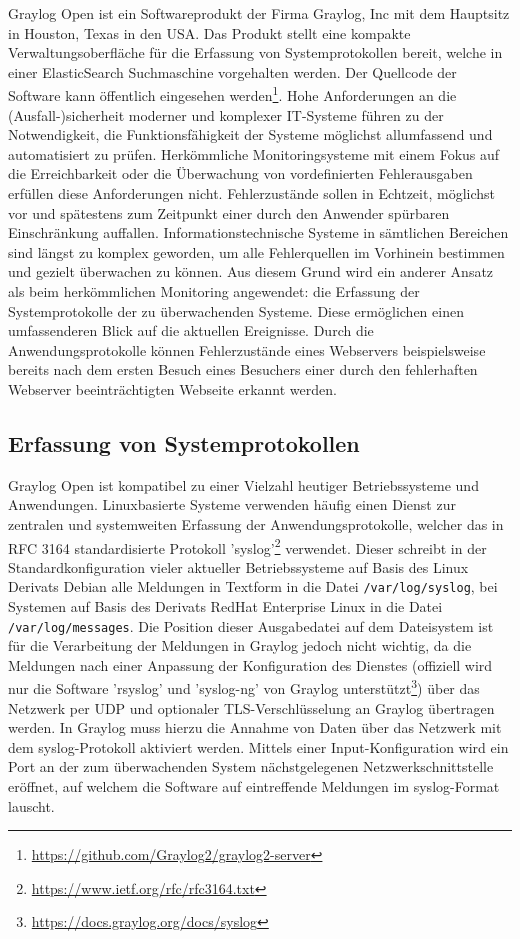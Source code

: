 Graylog Open ist ein Softwareprodukt der Firma Graylog, Inc mit dem Hauptsitz in Houston, Texas in den USA. Das Produkt stellt eine kompakte Verwaltungsoberfläche für die Erfassung von Systemprotokollen bereit, welche in einer ElasticSearch Suchmaschine vorgehalten werden. Der Quellcode der Software kann öffentlich eingesehen werden\footnote{\url{https://github.com/Graylog2/graylog2-server}}. Hohe Anforderungen an die (Ausfall-)sicherheit moderner und komplexer IT-Systeme führen zu der Notwendigkeit, die Funktionsfähigkeit der Systeme möglichst allumfassend und automatisiert zu prüfen. Herkömmliche Monitoringsysteme mit einem Fokus auf die Erreichbarkeit oder die Überwachung von vordefinierten Fehlerausgaben erfüllen diese Anforderungen nicht. Fehlerzustände sollen in Echtzeit, möglichst vor und spätestens zum Zeitpunkt einer durch den Anwender spürbaren Einschränkung auffallen. Informationstechnische Systeme in sämtlichen Bereichen sind längst zu komplex geworden, um alle Fehlerquellen im Vorhinein bestimmen und gezielt überwachen zu können. Aus diesem Grund wird ein anderer Ansatz als beim herkömmlichen Monitoring angewendet: die Erfassung der Systemprotokolle der zu überwachenden Systeme. Diese ermöglichen einen umfassenderen Blick auf die aktuellen Ereignisse. Durch die Anwendungsprotokolle können Fehlerzustände eines Webservers beispielsweise bereits nach dem ersten Besuch eines Besuchers einer durch den fehlerhaften Webserver beeinträchtigten Webseite erkannt werden.

\subsection{Erfassung von Systemprotokollen}

Graylog Open ist kompatibel zu einer Vielzahl heutiger Betriebssysteme und Anwendungen. Linuxbasierte Systeme verwenden häufig einen Dienst zur zentralen und systemweiten Erfassung der Anwendungsprotokolle, welcher das in RFC 3164 standardisierte Protokoll 'syslog'\footnote{\url{https://www.ietf.org/rfc/rfc3164.txt}} verwendet. Dieser schreibt in der Standardkonfiguration vieler aktueller Betriebssysteme auf Basis des Linux Derivats Debian alle Meldungen in Textform in die Datei \lstinline{/var/log/syslog}, bei Systemen auf Basis des Derivats RedHat Enterprise Linux in die Datei \lstinline{/var/log/messages}. Die Position dieser Ausgabedatei auf dem Dateisystem ist für die Verarbeitung der Meldungen in Graylog jedoch nicht wichtig, da die Meldungen nach einer Anpassung der Konfiguration des Dienstes (offiziell wird nur die Software 'rsyslog' und 'syslog-ng' von Graylog unterstützt\footnote{\url{https://docs.graylog.org/docs/syslog}}) über das Netzwerk per UDP und optionaler TLS-Verschlüsselung an Graylog übertragen werden. In Graylog muss hierzu die Annahme von Daten über das Netzwerk mit dem syslog-Protokoll aktiviert werden. Mittels einer Input-Konfiguration wird ein Port an der zum überwachenden System nächstgelegenen Netzwerkschnittstelle eröffnet, auf welchem die Software auf eintreffende Meldungen im syslog-Format lauscht.

